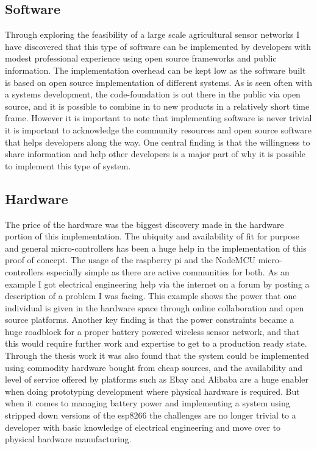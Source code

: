 \documentclass[]{uiophd}
\begin{document}
\subsection{Software}
Through exploring the feasibility of a large scale agricultural sensor networks I have discovered that this type of software can be implemented by developers with modest professional experience using open source frameworks and public information. The implementation overhead can be kept low as the software built is based on open source implementation of different systems. As is seen often with a systems development, the code-foundation is out there in the public via open source, and it is possible to combine in to new products in a relatively short time frame. However it is important to note that implementing software is never trivial it is important to acknowledge the community resources and open source software that helps developers along the way. One central finding is that the willingness to share information and help other developers is a major part of why it is possible to implement this type of system.

\subsection{Hardware}
The price of the hardware was the biggest discovery made in the hardware portion of this implementation. The ubiquity and availability of fit for purpose and general micro-controllers has been a huge help in the implementation of this proof of concept. The usage of the raspberry pi and the NodeMCU micro-controllers especially simple as there are active communities for both. As an example I got electrical engineering help via the internet on a forum by posting a description of a problem I was facing. This example shows the power that one individual is given in the hardware space through online collaboration and open source platforms.  Another key finding is that the power constraints became a huge roadblock for a proper battery powered wireless sensor network, and that this would require further work and expertise to get to a production ready state. Through the thesis work it was also found that the system could be implemented using commodity hardware bought from cheap sources, and the availability and level of service offered by platforms such as Ebay and Alibaba are a huge enabler when doing prototyping development where physical hardware is required. But when it comes to managing battery power and implementing a system using stripped down versions of the esp8266 \cite{espressif} the challenges are no longer trivial to a developer with basic knowledge of electrical engineering and move over to physical hardware manufacturing.
\end{document}
